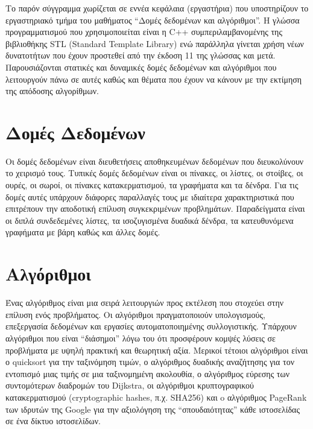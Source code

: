 Το παρόν σύγγραμμα χωρίζεται σε εννέα κεφάλαια (εργαστήρια) που υποστηρίζουν το εργαστηριακό τμήμα του μαθήματος ``Δομές δεδομένων και αλγόριθμοι''. Η γλώσσα προγραμματισμού που χρησιμοποιείται είναι η C++ συμπεριλαμβανομένης της βιβλιοθήκης STL (Standard Template Library) ενώ παράλληλα γίνεται χρήση νέων δυνατοτήτων που έχουν προστεθεί από την έκδοση 11 της γλώσσας και μετά. Παρουσιάζονται στατικές και δυναμικές δομές δεδομένων και αλγόριθμοι που λειτουργούν πάνω σε αυτές καθώς και θέματα που έχουν να κάνουν με την εκτίμηση της απόδοσης αλγορίθμων.

\section*{Δομές Δεδομένων}
Οι δομές δεδομένων είναι διευθετήσεις αποθηκευμένων δεδομένων που διευκολύνουν το χειρισμό τους. Τυπικές δομές δεδομένων είναι οι πίνακες, οι λίστες, οι στοίβες, οι ουρές, οι σωροί, οι πίνακες κατακερματισμού, τα γραφήματα και τα δένδρα. Για τις δομές αυτές υπάρχουν διάφορες παραλλαγές τους με ιδιαίτερα χαρακτηριστικά που επιτρέπουν την αποδοτική επίλυση συγκεκριμένων προβλημάτων. Παραδείγματα είναι οι διπλά συνδεδεμένες λίστες, τα ισοζυγισμένα δυαδικά δένδρα, τα κατευθυνόμενα γραφήματα με βάρη καθώς και άλλες δομές.

\section*{Αλγόριθμοι}
Ένας αλγόριθμος είναι μια σειρά λειτουργιών προς εκτέλεση που στοχεύει στην επίλυση ενός προβλήματος. Οι αλγόριθμοι πραγματοποιούν υπολογισμούς, επεξεργασία δεδομένων και εργασίες αυτοματοποιημένης συλλογιστικής. Υπάρχουν αλγόριθμοι που είναι ``διάσημοι'' λόγω του ότι προσφέρουν κομψές λύσεις σε προβλήματα με υψηλή πρακτική και θεωρητική αξία. Μερικοί τέτοιοι αλγόριθμοι είναι ο quicksort για την ταξινόμηση τιμών, ο αλγόριθμος δυαδικής αναζήτησης για τον εντοπισμό μιας τιμής σε μια ταξινομημένη ακολουθία, ο αλγόριθμος εύρεσης των συντομότερων διαδρομών του Dijkstra, οι αλγόριθμοι κρυπτογραφικού κατακερματισμού (cryptographic hashes, π.χ. SHA256) και o αλγόριθμος PageRank των ιδρυτών της Google για την αξιολόγηση της ``σπουδαιότητας'' κάθε ιστοσελίδας σε ένα δίκτυο ιστοσελίδων.  

